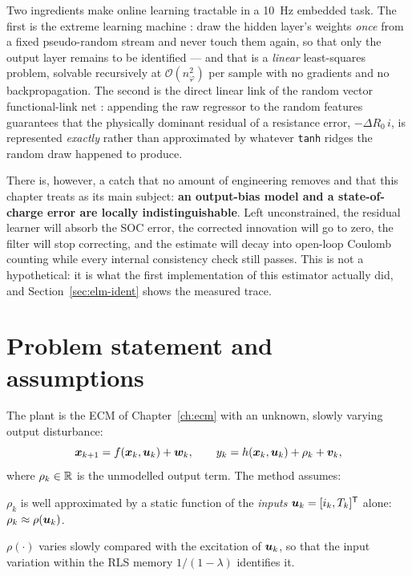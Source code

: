 Two ingredients make online learning tractable in a \SI{10}{\hertz} embedded task.  The first is
the extreme learning machine \citep{huang2006elm}: draw the hidden layer's weights \emph{once} from
a fixed pseudo-random stream and never touch them again, so that only the output layer remains to
be identified --- and that is a \emph{linear} least-squares problem, solvable recursively
\citep{liang2006oselm} at $\mathcal{O}(n_\varphi^2)$ per sample with no gradients and no
backpropagation.  The second is the direct linear link of the random vector functional-link net
\citep{pao1994rvfl}: appending the raw regressor to the random features guarantees that the
physically dominant residual of a resistance error, $-\Delta R_0\, i$, is represented
\emph{exactly} rather than approximated by whatever \texttt{tanh} ridges the random draw happened
to produce.

There is, however, a catch that no amount of engineering removes and that this chapter treats as
its main subject: \textbf{an output-bias model and a state-of-charge error are locally
indistinguishable}.  Left unconstrained, the residual learner will absorb the SOC error, the
corrected innovation will go to zero, the filter will stop correcting, and the estimate will decay
into open-loop Coulomb counting while every internal consistency check still passes.  This is not
a hypothetical: it is what the first implementation of this estimator actually did, and
Section~\ref{sec:elm-ident} shows the measured trace.

\section{Problem statement and assumptions}
The plant is the ECM of Chapter~\ref{ch:ecm} with an unknown, slowly varying output disturbance:
\begin{equation}\label{eq:elm-plant}
\bm{x}_{k+1} = f(\bm{x}_k,\bm{u}_k) + \bm{w}_k,\qquad
y_k = h(\bm{x}_k,\bm{u}_k) + \rho_k + \bm{v}_k,
\end{equation}
where $\rho_k\in\mathbb{R}$ is the unmodelled output term.  The method assumes:

\begin{assumption}\label{as:elm-exo}
$\rho_k$ is well approximated by a static function of the \emph{inputs} $\bm{u}_k = [i_k, T_k]^{\mathsf{T}}$
alone: $\rho_k \approx \rho(\bm{u}_k)$.
\end{assumption}

\begin{assumption}\label{as:elm-ts}
$\rho(\cdot)$ varies slowly compared with the excitation of $\bm{u}_k$, so that the input variation
within the RLS memory $1/(1-\lambda)$ identifies it.
\end{assumption}

